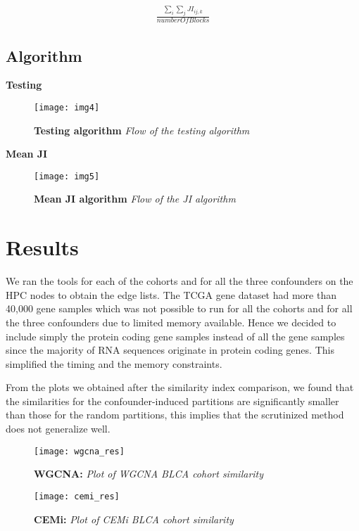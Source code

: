 \documentclass[a4paper]{paper}
\begin{document}
\begin{align}
 \frac{\sum_i\sum_j JI_{ij,k}}{numberOfBlocks}
\end{align}


\subsection{Algorithm}
\textbf{Testing}
\begin{figure}[h!]
    \centering
    \texttt{[image: img4]}
    \caption{ \textbf{Testing algorithm} \textit{Flow of the testing algorithm}}
    \label{fig:my_label}
\end{figure}

\textbf{Mean JI}
\begin{figure}[h!]
    \centering
    \texttt{[image: img5]}
    \caption{ \textbf{Mean JI algorithm} \textit{Flow of the JI algorithm}}
    \label{fig:my_label}
\end{figure}
\section{Results}
We ran the tools for each of the cohorts and for all the three confounders on the HPC nodes to obtain the edge lists. The TCGA gene dataset had more than 40,000 gene samples which was not possible to run for all the cohorts and for all the three confounders due to limited memory available. Hence we decided to include simply the protein coding gene samples instead of all the gene samples since the majority of RNA sequences originate in protein coding genes. This simplified the timing and the memory constraints. 

\bigskip
\noindent
From the plots we obtained after the similarity index comparison, we found that the similarities for the confounder-induced partitions are significantly smaller than those for the random partitions, this
implies that the scrutinized method does not generalize well.

\begin{figure}[h!]
    \centering
    \texttt{[image: wgcna\_res]}
    \caption{ \textbf{WGCNA:} \textit{Plot of WGCNA BLCA cohort similarity}}
    \label{fig:my_label}
\end{figure}

\begin{figure}[h!]
    \centering
    \texttt{[image: cemi\_res]}
    \caption{ \textbf{CEMi:} \textit{Plot of CEMi BLCA cohort similarity}}
    \label{fig:my_label}
\end{figure}
\end{document}
